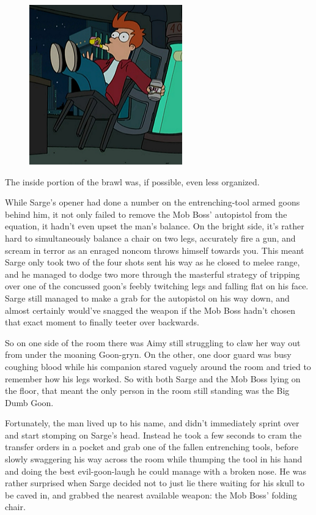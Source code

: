 \begin{figure}
	\begin{center}
		\includegraphics[width=\figwidth]{pics/21/49.png}
	\end{center}
\end{figure}
The inside portion of the brawl was, if possible, even less organized.

While Sarge's opener had done a number on the entrenching-tool armed goons behind him, it not only failed to remove the Mob Boss' autopistol from the equation, it hadn't even upset the man's balance. 
On the bright side, it's rather hard to simultaneously balance a chair on two legs, accurately fire a gun, and scream in terror as an enraged noncom throws himself towards you. 
This meant Sarge only took two of the four shots sent his way as he closed to melee range, and he managed to dodge two more through the masterful strategy of tripping over one of the concussed goon's feebly twitching legs and falling flat on his face. 
Sarge still managed to make a grab for the autopistol on his way down, and almost certainly would've snagged the weapon if the Mob Boss hadn't chosen that exact moment to finally teeter over backwards.

So on one side of the room there was Aimy still struggling to claw her way out from under the moaning Goon-gryn. 
On the other, one door guard was busy coughing blood while his companion stared vaguely around the room and tried to remember how his legs worked. 
So with both Sarge and the Mob Boss lying on the floor, that meant the only person in the room still standing was the Big Dumb Goon. 


Fortunately, the man lived up to his name, and didn't immediately sprint over and start stomping on Sarge's head. 
Instead he took a few seconds to cram the transfer orders in a pocket and grab one of the fallen entrenching tools, before slowly swaggering his way across the room while thumping the tool in his hand and doing the best evil-goon-laugh he could manage with a broken nose. 
He was rather surprised when Sarge decided not to just lie there waiting for his skull to be caved in, and grabbed the nearest available weapon: 
the Mob Boss' folding chair.

